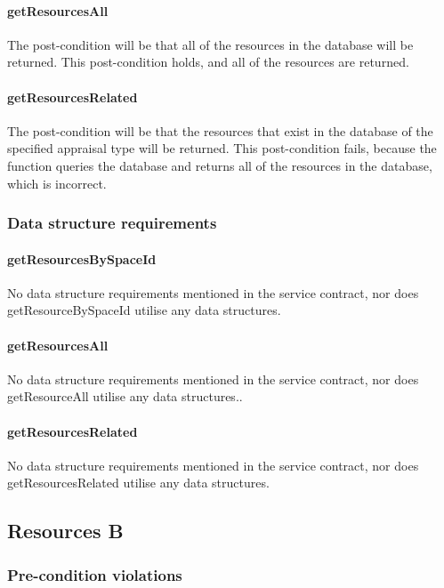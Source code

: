 \documentclass[a4paper]{article}
\begin{document}
\paragraph{getResourcesAll}
The post-condition will be that all of the resources in the database will be returned. This post-condition holds, and all of the resources are returned.

\paragraph{getResourcesRelated}
The post-condition will be that the resources that exist in the database of the specified appraisal type will be returned. This post-condition fails, because the function queries the database and returns all of the resources in the database, which is incorrect.

\subsubsection {Data structure requirements}

\paragraph{getResourcesBySpaceId}
No data structure requirements mentioned in the service contract, nor does getResourceBySpaceId utilise any data structures.

\paragraph{getResourcesAll}
No data structure requirements mentioned in the service contract, nor does getResourceAll utilise any data structures..

\paragraph{getResourcesRelated}
No data structure requirements mentioned in the service contract, nor does getResourcesRelated utilise any data structures.

\subsection {Resources B}
\subsubsection {Pre-condition violations}
\end{document}
